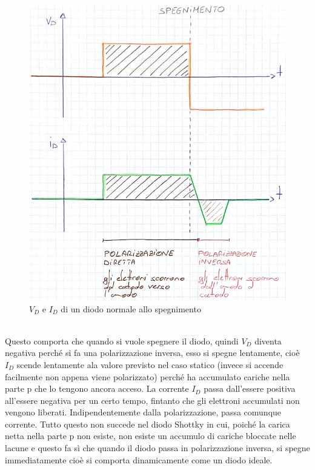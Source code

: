 \documentclass[12pt, a4paper]{report}
\begin{document}
\begin{enumerate}
    \begin{figure}[ht]
        \centering
        \includegraphics[scale=0.35,angle=0]{diodo_spegnimento.png}
        \caption{$V_{D}$ e $I_{D}$ di un diodo normale allo spegnimento}
    \end{figure}
    \\Questo comporta che quando si vuole spegnere il diodo, quindi $V_{D}$ diventa negativa perché si fa una polarizzazione inversa, esso si spegne lentamente, cioè $I_{D}$ scende lentamente ala valore previsto nel caso statico (invece si accende facilmente non appena viene polarizzato) perché ha accumulato cariche nella parte p che lo tengono ancora acceso. La corrente $I_{D}$ passa dall'essere positiva all'essere negativa per un certo tempo, fintanto che gli elettroni accumulati non vengono liberati. Indipendentemente dalla polarizzazione, passa comunque corrente. Tutto questo non succede nel diodo Shottky in cui, poiché la carica netta nella parte p non esiste, non esiste un accumulo di cariche bloccate nelle lacune e questo fa sì che quando il diodo passa in polarizzazione inversa, si spegne immediatamente cioè si comporta dinamicamente come un diodo ideale.
\end{enumerate}
\end{document}
